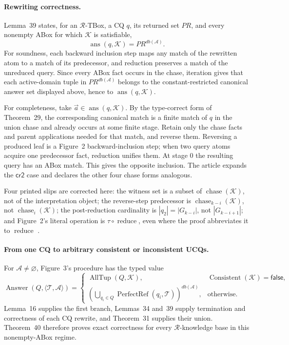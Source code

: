 \paragraph{Rewriting correctness.}
Lemma~39 states, for an \(\mathcal R\)-TBox, a CQ \(q\), its returned set \(PR\),
and every nonempty ABox for which \(\mathcal K\) is satisfiable,
\[
 \operatorname{ans}(q,\mathcal K)=PR^{db(\mathcal A)}.
\]
For soundness, each backward inclusion step maps any match of the rewritten
atom to a match of its predecessor, and reduction preserves a match of the
unreduced query.  Since every ABox fact occurs in the chase, iteration gives
that each active-domain tuple in \(PR^{db(\mathcal A)}\) belongs to the
constant-restricted canonical answer set displayed above, hence to
\(\operatorname{ans}(q,\mathcal K)\).

For completeness, take \(\vec a\in\operatorname{ans}(q,\mathcal K)\).  By the
type-correct form of Theorem~29, the corresponding canonical match is a finite
match of \(q\) in the union chase and already occurs at some finite stage.
Retain only the chase facts and parent applications needed for that match, and
reverse them.  Reversing a produced leaf is a Figure~2
backward-inclusion step; when two query atoms acquire one predecessor fact,
reduction unifies them.  At stage \(0\) the resulting query has an ABox match.
This gives the opposite inclusion.  The article expands the
\(\mathsf{cr2}\) case and declares the other four chase forms analogous.

Four printed slips are corrected here: the witness set is a subset of
\(\operatorname{chase}(\mathcal K)\), not of the interpretation object; the
reverse-step predecessor is \(\operatorname{chase}_{k-i}(\mathcal K)\), not
\(\operatorname{chase}_{i}(\mathcal K)\); the post-reduction cardinality is
\(|q_2|=|G_{k-i}|\), not \(|G_{k-i+1}|\); and Figure~2's literal operation is
\(\tau\circ\operatorname{reduce}\), even where the proof abbreviates it to
\(\operatorname{reduce}\) \cite[pp.~419--421]{CalvaneseEtAl2007}.

\paragraph{From one CQ to arbitrary consistent or inconsistent UCQs.}
For \(\mathcal A\ne\varnothing\), Figure~3's procedure has the typed value
\[
 \operatorname{Answer}(Q,\langle\mathcal T,\mathcal A\rangle)=
 \begin{cases}
  \operatorname{AllTup}(Q,\mathcal K),
       &\operatorname{Consistent}(\mathcal K)=\mathsf{false},\\
  \left(\displaystyle\bigcup_{q_i\in Q}
     \operatorname{PerfectRef}(q_i,\mathcal T)\right)^{db(\mathcal A)},
       &\text{otherwise}.
 \end{cases}
\]
Lemma~16 supplies the first branch, Lemmas~34 and~39 supply termination and
correctness of each CQ rewrite, and Theorem~31 supplies their union.  Theorem~40
therefore proves exact correctness for every \(\mathcal R\)-knowledge base in
this nonempty-ABox regime.

